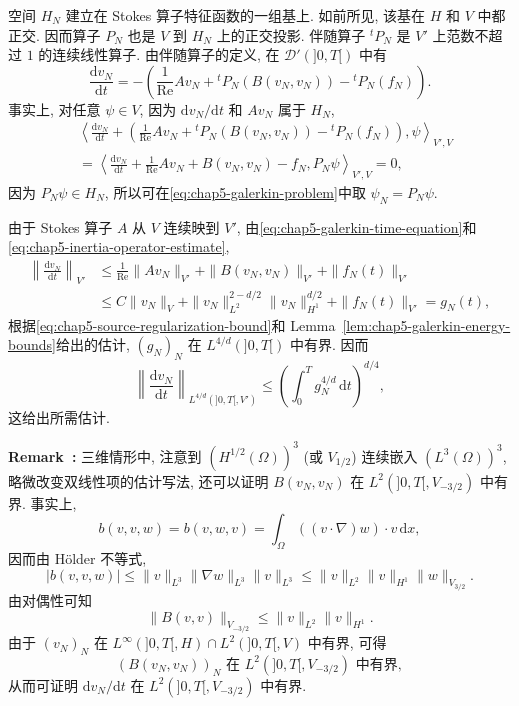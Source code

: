 \begin{Proof}
空间 $H_N$ 建立在 Stokes 算子特征函数的一组基上. 如前所见, 该基在 $H$ 和 $V$ 中都正交. 因而算子 $P_N$ 也是 $V$ 到 $H_N$ 上的正交投影. 伴随算子 ${}^tP_N$ 是 $V'$ 上范数不超过 $1$ 的连续线性算子. 由伴随算子的定义, 在 $\mathcal D'(]0,T[)$ 中有
\begin{equation}
 \frac{\mathrm dv_N}{\mathrm dt}
 =-\left(\frac1{\operatorname{Re}}Av_N+{}^tP_N(B(v_N,v_N))-{}^tP_N(f_N)\right).
\label{eq:chap5-galerkin-time-equation}
\end{equation}
事实上, 对任意 $\psi\in V$, 因为 $\mathrm dv_N/\mathrm dt$ 和 $Av_N$ 属于 $H_N$,
\begin{align*}
 &\left\langle\frac{\mathrm dv_N}{\mathrm dt}
 +\left(\frac1{\operatorname{Re}}Av_N+{}^tP_N(B(v_N,v_N))-{}^tP_N(f_N)\right),\psi\right\rangle_{V',V}\\
 &=\left\langle\frac{\mathrm dv_N}{\mathrm dt}
 +\frac1{\operatorname{Re}}Av_N+B(v_N,v_N)-f_N,P_N\psi\right\rangle_{V',V}=0,
\end{align*}
因为 $P_N\psi\in H_N$, 所以可在\eqref{eq:chap5-galerkin-problem}中取 $\psi_N=P_N\psi$.

由于 Stokes 算子 $A$ 从 $V$ 连续映到 $V'$, 由\eqref{eq:chap5-galerkin-time-equation}和\eqref{eq:chap5-inertia-operator-estimate},
\begin{align*}
 \left\|\frac{\mathrm dv_N}{\mathrm dt}\right\|_{V'}
 &\leq\frac1{\operatorname{Re}}\|Av_N\|_{V'}
 +\|B(v_N,v_N)\|_{V'}+\|f_N(t)\|_{V'}\\
 &\leq C\|v_N\|_V
 +\|v_N\|_{L^2}^{2-d/2}\|v_N\|_{H^1}^{d/2}
 +\|f_N(t)\|_{V'}
 =g_N(t),
\end{align*}
根据\eqref{eq:chap5-source-regularization-bound}和 Lemma~\ref{lem:chap5-galerkin-energy-bounds}给出的估计, $(g_N)_N$ 在 $L^{4/d}(]0,T[)$ 中有界. 因而
\[
 \left\|\frac{\mathrm dv_N}{\mathrm dt}\right\|_{L^{4/d}(]0,T[,V')}
 \leq\left(\int_0^Tg_N^{4/d}\,\mathrm dt\right)^{d/4},
\]
这给出所需估计.
\end{Proof}

\par\noindent{}\textbf{Remark~\thechapterfivesectiononeremark:}\label{rem:chap5-galerkin-vminus-three-halves}
三维情形中, 注意到 $(H^{1/2}(\Omega))^3$ (或 $V_{1/2}$) 连续嵌入 $(L^3(\Omega))^3$, 略微改变双线性项的估计写法, 还可以证明 $B(v_N,v_N)$ 在 $L^2(]0,T[,V_{-3/2})$ 中有界. 事实上,
\[
 b(v,v,w)=b(v,w,v)=\int_\Omega((v\cdot\nabla)w)\cdot v\,\mathrm dx,
\]
因而由 Hölder 不等式,
\[
 |b(v,v,w)|\leq\|v\|_{L^3}\|\nabla w\|_{L^3}\|v\|_{L^3}
 \leq\|v\|_{L^2}\|v\|_{H^1}\|w\|_{V_{3/2}}.
\]
由对偶性可知
\[
 \|B(v,v)\|_{V_{-3/2}}\leq\|v\|_{L^2}\|v\|_{H^1}.
\]
由于 $(v_N)_N$ 在 $L^\infty(]0,T[,H)\cap L^2(]0,T[,V)$ 中有界, 可得
\[
 (B(v_N,v_N))_N\text{ 在 }L^2(]0,T[,V_{-3/2})\text{ 中有界},
\]
从而可证明 $\mathrm dv_N/\mathrm dt$ 在 $L^2(]0,T[,V_{-3/2})$ 中有界.

